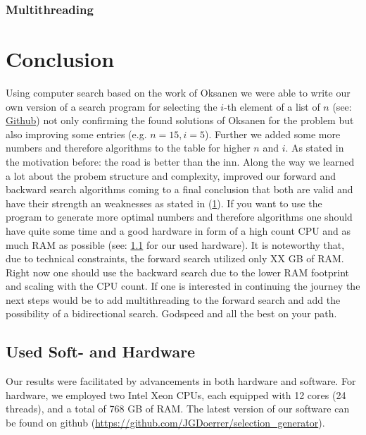 \documentclass[10pt,journal,compsoc]{IEEEtran}
\begin{document}
\subsubsection{Multithreading}

\section{Conclusion}
Using computer search based on the work of Oksanen we were able to write our own
version of a search program for selecting the $i$-th element of a list of $n$
(see: \href{https://github.com/JGDoerrer/selection_generator}{Github}) not only
confirming the found solutions of Oksanen for the problem but also improving
some entries (e.g. $n=15, i=5$). Further we added some more numbers and
therefore algorithms to the table for higher $n$ and $i$. As stated in the
motivation before: the road is better than the inn. Along the way we learned a
lot about the probem structure and complexity, improved our forward and backward
search algorithms coming to a final conclusion that both are valid and have
their strength an weaknesses as stated in (\ref{}). If you want to use the
program to generate more optimal numbers and therefore algorithms one should
have quite some time and a good hardware in form of a high count CPU and as much
RAM as possible (see: \ref{sec:hardware} for our used hardware). It is noteworthy
that, due to technical constraints, the forward search utilized only XX GB of RAM. %
Right now one should use
the backward search due to the lower RAM footprint and scaling with the CPU
count. If one is interested in continuing the journey the next steps would be to
add multithreading to the forward search and add the possibility of a
bidirectional search. Godspeed and all the best on your path.


\subsection{Used Soft- and Hardware} \label{sec:hardware}

Our results were facilitated by advancements in both hardware and software.
For hardware, we employed two Intel Xeon CPUs, each equipped with 12 cores (24 threads), and a total of 768 GB of RAM. %
The latest version of our software can be found on github (\url{https://github.com/JGDoerrer/selection_generator}).

\end{document}
